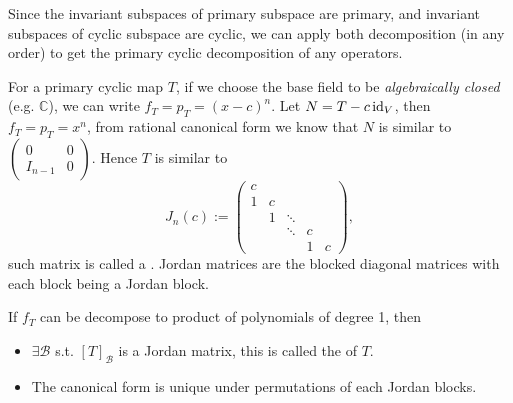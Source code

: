 Since the invariant subspaces of primary subspace are primary,
and invariant subspaces of cyclic subspace are cyclic,
we can apply both decomposition (in any order) to get the primary
cyclic decomposition of any operators.

For a primary cyclic map $T$, if we choose the base field to
be \textit{algebraically closed} (e.g. $\mathbb{C}$), we can write
$f_T = p_T = (x-c)^n$.
Let $N = T - c\operatorname{id}_V$, then $f_T = p_T = x^n$,
from rational canonical form we know that $N$ is similar to
$\begin{pmatrix}
	0 &0 \\ I_{n-1} &0
\end{pmatrix}$.
Hence $T$ is similar to
 \[
J_n(c) :=
\begin{pmatrix}
	c \\ 1 &c \\ &1 &\ddots \\ &&\ddots &c \\ &&&1 &c
\end{pmatrix},
\]
such matrix is called a .
Jordan matrices are the blocked diagonal matrices with
each block being a Jordan block.

\begin{theorem}
    If $f_T$ can be decompose to product of polynomials of degree 1, then
	 \begin{itemize}
		 \item $\exists \mathcal{B}$ s.t. $[T]_{\mathcal{B}}$ is a Jordan matrix,
			 this is called the  of $T$.
		\item The canonical form is unique under permutations of each Jordan blocks.
	\end{itemize}
\end{theorem}

